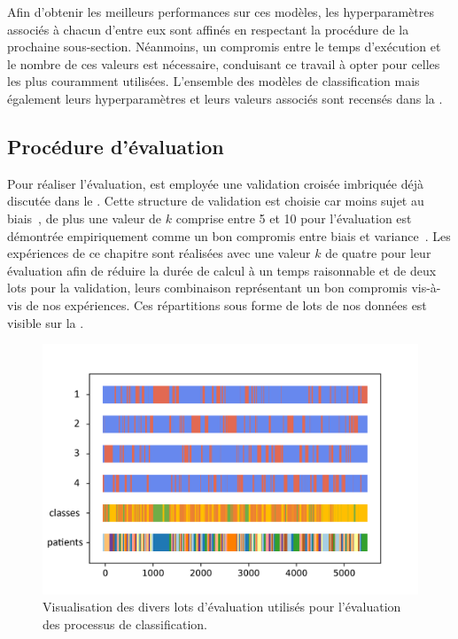 Afin d'obtenir les meilleurs performances sur ces modèles, les hyperparamètres associés à chacun d'entre eux sont affinés en respectant la procédure de la prochaine sous-section. Néanmoins, un compromis entre le temps d'exécution et le nombre de ces valeurs est nécessaire, conduisant ce travail à opter pour celles les plus couramment utilisées. L'ensemble des modèles de classification mais également leurs hyperparamètres et leurs valeurs associés sont recensés dans la .\par

\subsection{Procédure d'évaluation}
Pour réaliser l'évaluation, est employée une validation croisée imbriquée déjà discutée dans le . Cette structure de validation est choisie car moins sujet au biais~\cite{Cawley2010}, de plus une valeur de $k$ comprise entre 5 et 10 pour l'évaluation est démontrée empiriquement comme un bon compromis entre biais et variance~\cite{James2000}. Les expériences de ce chapitre sont réalisées avec une valeur $k$ de quatre pour leur évaluation afin de réduire la durée de calcul à un temps raisonnable et de deux lots pour la validation, leurs combinaison représentant un bon compromis vis-à-vis de nos expériences. Ces répartitions sous forme de lots de nos données est visible sur la .\par

\begin{figure}[H]
    \centering
    \includegraphics[width=0.9\linewidth]{contents/chapter_4/resources/visualisation_folds.png}
    \caption{Visualisation des divers lots d'évaluation utilisés pour l'évaluation des processus de classification.}
    \label{fig:visualisation_folds}
\end{figure}\par

